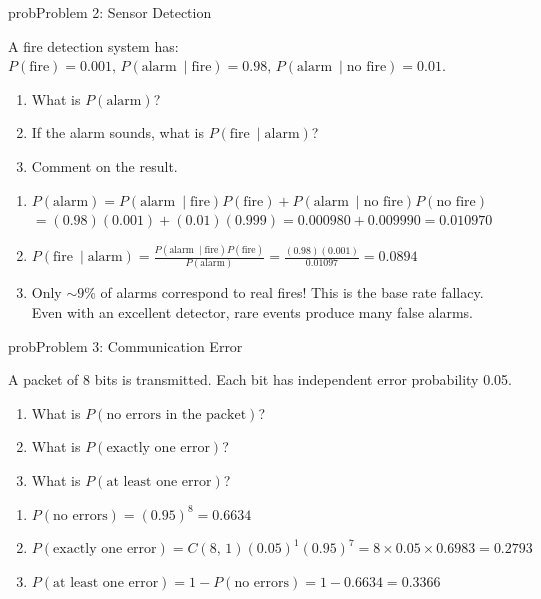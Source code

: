 \begin{PSbox}[unbreakable]{prob}{Problem 2: Sensor Detection}

A fire detection system has: $P(\text{fire}) = 0.001,\, P(\text{alarm}\ \mid \text{fire}) = 0.98,\, P(\text{alarm}\ \mid \text{no fire}) = 0.01$.

\begin{enumerate}
\def\labelenumi{(\alph{enumi})}
\tightlist
\item
  What is $P(\text{alarm})$?
\item
  If the alarm sounds, what is $P(\text{fire}\ \mid \text{alarm})$?
\item
  Comment on the result.
\end{enumerate}

\PSsolution{} 

\begin{enumerate}
\def\labelenumi{(\alph{enumi})}
\item
  $P(\text{alarm}) = P(\text{alarm}\ \mid \text{fire})P(\text{fire}) + P(\text{alarm}\ \mid \text{no fire})P(\text{no fire})$\PSbr{}$= (0.98)(0.001) + (0.01)(0.999) = 0.000980 + 0.009990 = 0.010970$
\item
  $\displaystyle P(\text{fire}\ \mid \text{alarm}) = \frac{P(\text{alarm}\ \mid \text{fire})P(\text{fire})}{P(\text{alarm})}$\PSbr{}$\displaystyle = \frac{(0.98)(0.001)}{0.01097} = 0.0894$
\item
  Only $\sim 9\%$ of alarms correspond to real fires! This is the base rate fallacy. Even with an excellent detector, rare events produce many false alarms.
\end{enumerate}

\end{PSbox}

\begin{PSbox}[unbreakable]{prob}{Problem 3: Communication Error}

A packet of 8 bits is transmitted. Each bit has independent error probability 0.05.

\begin{enumerate}
\def\labelenumi{(\alph{enumi})}
\tightlist
\item
  What is $P(\text{no errors in the packet})$?
\item
  What is $P(\text{exactly one error})$?
\item
  What is $P(\text{at least one error})$?
\end{enumerate}

\PSsolution{} 

\begin{enumerate}
\def\labelenumi{(\alph{enumi})}
\item
  $P(\text{no errors}) = (0.95)^{8} = 0.6634$
\item
  $P(\text{exactly one error}) = C(8,\,1)(0.05)^{1}(0.95)^{7} = 8 \times 0.05 \times 0.6983 = 0.2793$
\item
  $P(\text{at least one error}) = 1 - P(\text{no errors}) = 1 - 0.6634 = 0.3366$
\end{enumerate}

\end{PSbox}


